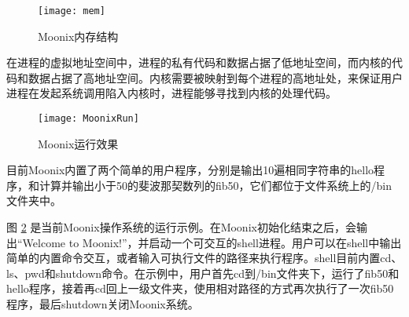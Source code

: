 \begin{figure}[htpb]
	\centering
	\texttt{[image: mem]}
	\setlength{\abovecaptionskip}{2pt}
	\caption{Moonix内存结构}
	\label{pic:moonixmem}
\end{figure}

在进程的虚拟地址空间中，进程的私有代码和数据占据了低地址空间，而内核的代码和数据占据了高地址空间。内核需要被映射到每个进程的高地址处，来保证用户进程在发起系统调用陷入内核时，进程能够寻找到内核的处理代码。

\begin{figure}[htpb]
	\centering
	\texttt{[image: MoonixRun]}
	\setlength{\abovecaptionskip}{2pt}
	\caption{Moonix运行效果}
	\label{pic:moonixrun}
\end{figure}

目前Moonix内置了两个简单的用户程序，分别是输出10遍相同字符串的hello程序，和计算并输出小于50的斐波那契数列的fib50，它们都位于文件系统上的/bin文件夹中。

图 \ref{pic:moonixrun} 是当前Moonix操作系统的运行示例。在Moonix初始化结束之后，会输出“Welcome to Moonix!”，并启动一个可交互的shell进程。用户可以在shell中输出简单的内置命令交互，或者输入可执行文件的路径来执行程序。shell目前内置cd、ls、pwd和shutdown命令。在示例中，用户首先cd到/bin文件夹下，运行了fib50和hello程序，接着再cd回上一级文件夹，使用相对路径的方式再次执行了一次fib50程序，最后shutdown关闭Moonix系统。
